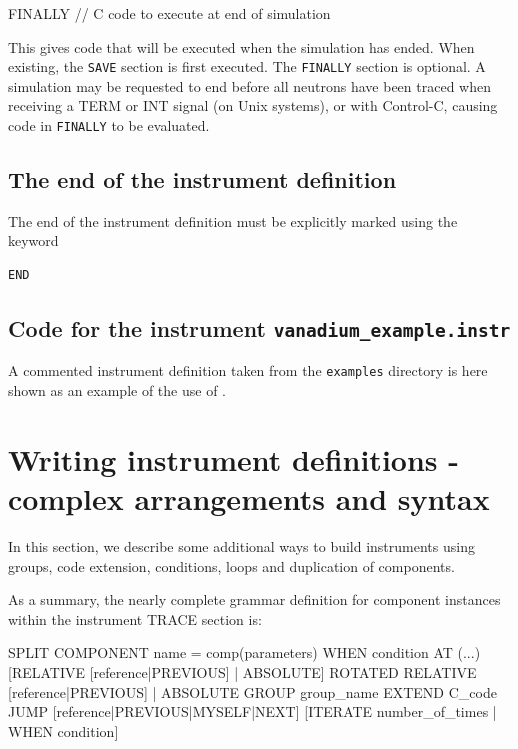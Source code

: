 \begin{mcstas}
FINALLY
   // C code to execute at end of simulation
\end{mcstas}
This gives code that will be executed when the simulation has
ended. When existing, the \texttt{SAVE} section is first executed. The
\texttt{FINALLY} section is optional.
A simulation may be requested to end before all neutrons have been
traced when receiving a TERM or INT signal (on Unix systems), or with
Control-C, causing code in \texttt{FINALLY} to be evaluated.


\subsection{The end of the instrument definition}
\label{s:end}

The end of the instrument definition must be explicitly marked using the keyword
\begin{lstlisting}
END
\end{lstlisting}

\subsection{Code for the instrument \texttt{vanadium\_example.instr}}
\label{s:Samples_vanadium.instr}
A commented instrument definition taken from the \texttt{examples} directory is
here shown as an example of the use of \MCS .



\section{Writing instrument definitions - complex arrangements and syntax}
\label{s:instrdefs-extend}

In this section, we describe some additional ways to build instruments using
groups, code extension, conditions, loops and duplication of components.

As a summary, the nearly complete grammar definition for component instances
within the instrument TRACE section is:

\begin{mcstas}
{SPLIT} COMPONENT name = comp(parameters) {WHEN condition}
  AT (...) [RELATIVE [reference|PREVIOUS] | ABSOLUTE]
  {ROTATED {RELATIVE [reference|PREVIOUS] | ABSOLUTE} }
  {GROUP group_name}
  {EXTEND C_code}
  {JUMP [reference|PREVIOUS|MYSELF|NEXT] [ITERATE number_of_times | WHEN condition] }
\end{mcstas}

